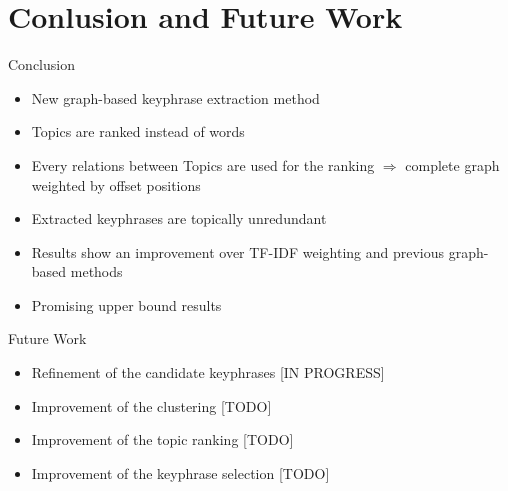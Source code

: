 \section{Conlusion and Future Work}
  \begin{frame}{Conclusion}
    \begin{itemize}
      \item{New graph-based keyphrase extraction method}
      \item{Topics are ranked instead of words}
      \item{Every relations between Topics are used for the ranking
            $\Rightarrow$ complete graph weighted by offset positions}
      \item{Extracted keyphrases are topically unredundant}
      \item{Results show an improvement over TF-IDF weighting and previous
            graph-based methods}
      \item{Promising upper bound results}
    \end{itemize}
  \end{frame}

  \begin{frame}{Future Work}
    \begin{itemize}
      \item{Refinement of the candidate keyphrases \footnotesize [IN PROGRESS]}
      \item{Improvement of the clustering \footnotesize [TODO]}
      \item{Improvement of the topic ranking \footnotesize [TODO]}
      \item{Improvement of the keyphrase selection \footnotesize [TODO]}
    \end{itemize}
  \end{frame}

